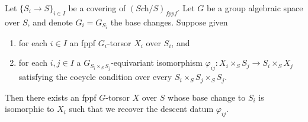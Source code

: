 \begin{lemma}
\label{lemma-descent-torsor}
Let $\{S_i \to S\}_{i \in I}$ be a covering of $(\textit{Sch}/S)_{fppf}$.
Let $G$ be a group algebraic space over $S$, and denote
$G_i = G_{S_i}$ the base changes. Suppose given
\begin{enumerate}
\item for each $i \in I$ an fppf $G_i$-torsor $X_i$ over $S_i$,
and
\item for each $i, j \in I$ a $G_{S_i \times_S S_j}$-equivariant isomorphism
$\varphi_{ij} : X_i \times_S S_j \to S_i \times_S X_j$ satisfying the cocycle
condition over every $S_i \times_S S_j \times_S S_j$.
\end{enumerate}
Then there exists an fppf $G$-torsor $X$ over $S$
whose base change to $S_i$ is isomorphic to $X_i$ such that we
recover the descent datum $\varphi_{ij}$.
\end{lemma}

